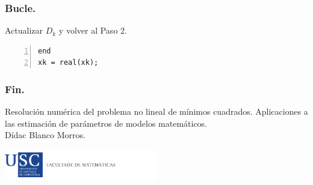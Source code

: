 \documentclass{beamer}
\begin{document}
\begin{frame}[fragile]
    \frametitle{Bucle.}
\begin{steps}[start=7]
    \item Actualizar $D_k$ y volver al Paso 2.
\end{steps}\pause
\vspace{0.5cm}
\begin{lstlisting}[frame=single, numbers=left, style=Matlab-editor]
    end
xk = real(xk);
\end{lstlisting}
\end{frame}

\begin{frame}
    \frametitle{Fin.}
    \vspace{1cm}
    \begin{center}
        Resolución numérica del problema no lineal de mínimos cuadrados.
Aplicaciones a las estimación de parámetros de modelos matemáticos. \\

        \vspace{1cm}
        Dídac Blanco Morros.
        \vspace{2cm}
    \end{center}
    \begin{center}
        \hspace{1cm}
        \includegraphics[width=0.5\textwidth]{logomath.pdf}
    \end{center}
\end{frame}
\end{document}
